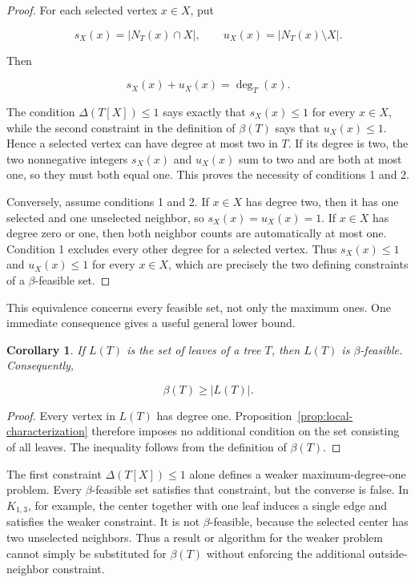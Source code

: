 \documentclass[preprint,12pt]{elsarticle}
\newtheorem{corollary}[theorem]{Corollary}
\numberwithin{equation}{section}
\begin{document}
\begin{proof}
For each selected vertex \(x\in X\), put

\[
s_X(x)=|N_T(x)\cap X|,
\qquad
u_X(x)=|N_T(x)\setminus X|.
\]

Then

\[
s_X(x)+u_X(x)=\deg_T(x).
\]

The condition \(\Delta(T[X])\le 1\) says exactly that \(s_X(x)\le 1\)
for every \(x\in X\), while the second constraint in the definition of
\(\beta(T)\) says that \(u_X(x)\le 1\). Hence a selected vertex can have
degree at most two in \(T\). If its degree is two, the two nonnegative
integers \(s_X(x)\) and \(u_X(x)\) sum to two and are both at most one,
so they must both equal one. This proves the necessity of conditions 1
and 2.

Conversely, assume conditions 1 and 2. If \(x\in X\) has degree two,
then it has one selected and one unselected neighbor, so
\(s_X(x)=u_X(x)=1\). If \(x\in X\) has degree zero or one, then both
neighbor counts are automatically at most one. Condition 1 excludes
every other degree for a selected vertex. Thus \(s_X(x)\le 1\) and
\(u_X(x)\le 1\) for every \(x\in X\), which are precisely the two
defining constraints of a \(\beta\)-feasible set.
\end{proof}

This equivalence concerns every feasible set, not only the maximum ones.
One immediate consequence gives a useful general lower bound.

\begin{corollary}\label{cor:leaves}
If \(L(T)\) is the set of leaves of a tree
\(T\), then \(L(T)\) is \(\beta\)-feasible. Consequently,

\[
\beta(T)\ge |L(T)|.
\]
\end{corollary}

\begin{proof}
Every vertex in \(L(T)\) has degree one. Proposition~\ref{prop:local-characterization}
therefore imposes no additional condition on the set consisting of all
leaves. The inequality follows from the definition of \(\beta(T)\).
\end{proof}

The first constraint \(\Delta(T[X])\le 1\) alone defines a weaker
maximum-degree-one problem. Every \(\beta\)-feasible set satisfies that
constraint, but the converse is false. In \(K_{1,3}\), for example, the
center together with one leaf induces a single edge and satisfies the
weaker constraint. It is not \(\beta\)-feasible, because the selected
center has two unselected neighbors. Thus a result or algorithm for the
weaker problem cannot simply be substituted for \(\beta(T)\) without
enforcing the additional outside-neighbor constraint.
\end{document}
